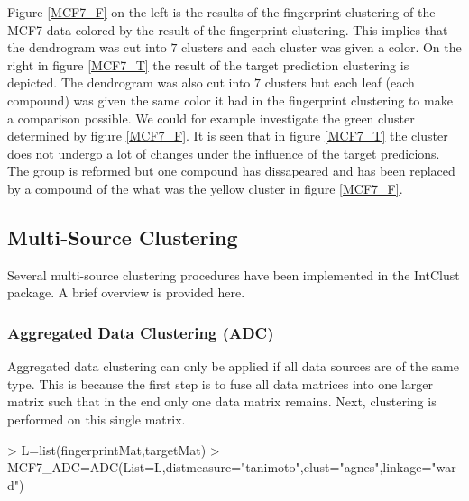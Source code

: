 \documentclass[a4paper]{article}
\begin{document}
\noindent Figure \ref{MCF7_F} on the left is the results of the fingerprint
clustering of the MCF7 data colored by the result of the fingerprint clustering.
This implies that the dendrogram was cut into $7$ clusters and each cluster was
given a color. On the right in figure \ref{MCF7_T} the result of the target prediction
clustering is depicted. The dendrogram was also cut into $7$ clusters but each
leaf (each compound) was given the same color it had in the fingerprint
clustering to make a comparison possible. We could for example investigate the
green cluster determined by figure \ref{MCF7_F}. It is seen that in figure
\ref{MCF7_T} the cluster does not undergo a lot of changes under the influence
of the target predicions. The group is reformed but one compound has dissapeared
and has been replaced by a compound of the what was the yellow cluster in figure
\ref{MCF7_F}.
\subsection{Multi-Source Clustering}
Several multi-source clustering procedures have been implemented in the IntClust
package. A brief overview is provided here.
\subsubsection{Aggregated Data Clustering (ADC)}
Aggregated data clustering can only be applied if all data sources are of the
same type. This is because the first step is to fuse all data matrices into one
larger matrix such that in the end only one data matrix remains. Next,
clustering is performed on this single matrix.
\begin{Schunk}
\begin{Sinput}
> L=list(fingerprintMat,targetMat)
> MCF7_ADC=ADC(List=L,distmeasure="tanimoto",clust="agnes",linkage="ward")
\end{Sinput}
\end{Schunk}
\end{document}
